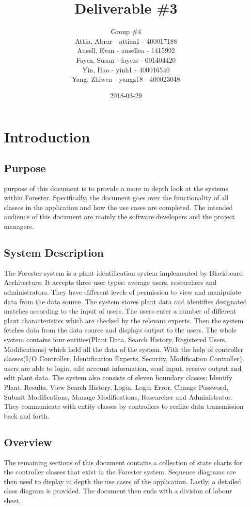 \documentclass[]{article}
\title{Deliverable \#3}
\author{Group \#4 \\
Attia, Abrar - attiaa1 - 400017188 \\
Ansell, Evan - ansellea - 1415992 \\
Fayez, Susan - fayezs - 001404420 \\
Yin, Hao - yinh1 - 400016540 \\
Yang, Zhiwen - yangz18 - 400023048 }
\date{2018-03-29}
\begin{document}
\maketitle	
\newpage
\section{Introduction}
\label{sec:introduction}
\subsection{Purpose}
\label{sub:purpose}
 purpose of this document is to provide a more in depth look at the systems within Forester. Specifically, the document goes over the functionality of all classes in the application and how the use cases are completed. The intended audience of this document are mainly the software developers and the project managers. 

\subsection{System Description}
\label{sub:system_description}

The Forester system is a plant identification system implemented by Blackboard Architecture. It accepts three user types: average users, researchers and administrators. They have different levels of permission to view and manipulate data from the data source. The system stores plant data and identifies designated matches according to the input of users. The users enter a number of different plant characteristics which are checked by the relevant experts. Then the system fetches data from the data source and displays output to the users.
The whole system contains four entities(Plant Data, Search History, Registered Users, Modifications) which hold all the data of the system. With the help of controller classes(I/O Controller, Identification Experts, Security, Modification Controller), users are able to login, edit account information, send input, receive output and edit plant data. The system also consists of eleven boundary classes: Identify Plant, Results, View Search History, Login, Login Error, Change Password, Submit Modifications, Manage Modifications, Researcher and Administrator. They communicate with entity classes by controllers to realize data transmission back and forth.


\subsection{Overview}
\label{sub:overview}
The remaining sections of this document contains a collection of state charts for the controller classes that exist in the Forester system. Sequence diagrams are then used to display in depth the use cases of the application. Lastly, a detailed class diagram is provided. The document then ends with a division of labour sheet. 
\end{document}
